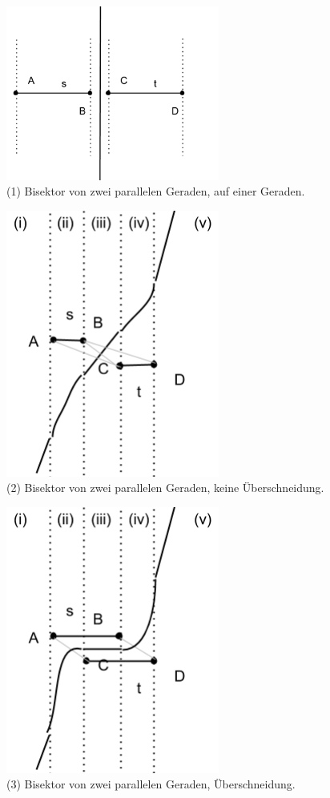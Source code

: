 \begin{figure}[h]
\begin{center}
\includegraphics[width=7cm]{img/ssp1.png}
\end{center}
\caption{(1) Bisektor von zwei parallelen Geraden, auf einer Geraden.}
\label{fig:a1}
\end{figure}

\begin{figure}[h]
\begin{center}
\includegraphics[width=7cm]{img/ssp2.png}
\end{center}
\caption{(2) Bisektor von zwei parallelen Geraden, keine Überschneidung.}
\label{fig:a2}
\end{figure}

\begin{figure}[h]
\begin{center}
\includegraphics[width=7cm]{img/ss3.png}
\end{center}
\caption{(3) Bisektor von zwei parallelen Geraden, Überschneidung.}
\label{fig:a3}
\end{figure}

